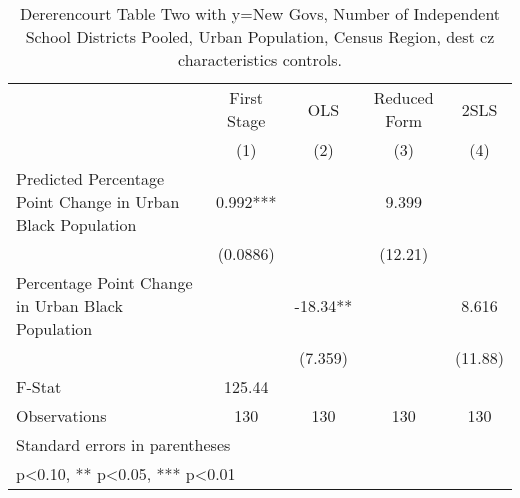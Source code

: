 \begin{table}[htbp]\centering
\def\sym#1{\ifmmode^{#1}\else\(^{#1}\)\fi}
\caption{Dererencourt Table Two with y=New Govs, Number of Independent School Districts  Pooled, Urban Population, Census Region, dest cz characteristics controls.}
\begin{tabular}{l*{4}{c}}
\toprule
                    & First Stage   &         OLS   &Reduced Form   &        2SLS   \\
                    &\multicolumn{1}{c}{(1)}   &\multicolumn{1}{c}{(2)}   &\multicolumn{1}{c}{(3)}   &\multicolumn{1}{c}{(4)}   \\
\midrule
Predicted Percentage Point Change in Urban Black Population&       0.992***&               &       9.399   &               \\
                    &    (0.0886)   &               &     (12.21)   &               \\
\addlinespace
Percentage Point Change in Urban Black Population&               &      -18.34** &               &       8.616   \\
                    &               &     (7.359)   &               &     (11.88)   \\
\midrule
F-Stat              &      125.44   &               &               &               \\
Observations        &         130   &         130   &         130   &         130   \\
\bottomrule
\multicolumn{5}{l}{\footnotesize Standard errors in parentheses}\\
\multicolumn{5}{l}{\footnotesize * p<0.10, ** p<0.05, *** p<0.01}\\
\end{tabular}
\end{table}

